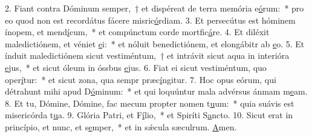 2. Fiant contra Dóminum semper,~† et dispéreat de terra memória e\uline{ó}rum:~* pro eo quod non est recordátus fácere misric\uline{ó}rdiam.
3. Et persecútus est hóminem ínopem, et mend\uline{í}cum,~* et compúnctum corde mortfic\uline{á}re.
4. Et diléxit maledictiónem, et véniet \uline{e}i:~* et nóluit benedictiónem, et elongábitr ab \uline{e}o.
5. Et índuit maledictiónem sicut vestiméntum,~† et intrávit sicut aqua in interióra \uline{e}jus,~* et sicut óleum in óssbus \uline{e}jus.
6. Fiat ei sicut vestiméntum, quo oper\uline{í}tur:~* et sicut zona, qua sempr præc\uline{í}ngitur.
7. Hoc opus eórum, qui détrahunt mihi apud D\uline{ó}minum:~* et qui loquúntur mala advérsus ánmam m\uline{e}am.
8. Et tu, Dómine, Dómine, fac mecum propter nomen t\uline{u}um:~* quia suávis est misericórda t\uline{u}a.
9. Glória Patri, et F\uline{í}lio,~* et Spiríti S\uline{a}ncto.
10. Sicut erat in princípio, et nunc, et s\uline{e}mper,~* et in sǽcula sæculrum. \uline{A}men.
